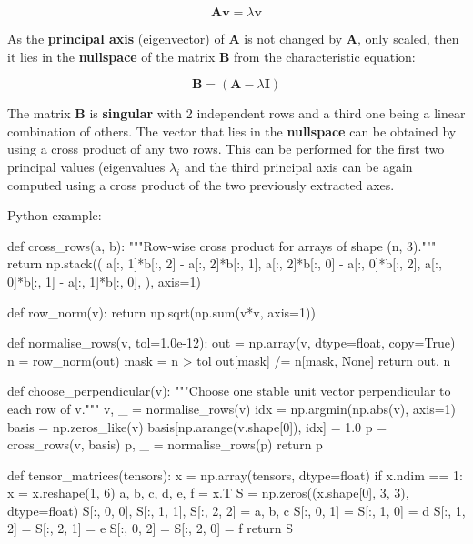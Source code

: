 \begin{itemize}
        \begin{equation}
            \mathbf{A}\mathbf{v} = \lambda \mathbf{v}
        \end{equation}

        As the \textbf{principal axis} (eigenvector) of $ \mathbf{A} $ is not changed
        by $ \mathbf{A} $, only scaled, then it lies in the \textbf{nullspace} of the
        matrix $ \mathbf{B} $ from the characteristic equation:

        \begin{equation}
            \mathbf{B} = (\mathbf{A} - \lambda \mathbf{I})
        \end{equation}

        The matrix $ \mathbf{B} $ is \textbf{singular} with 2 independent rows and
        a third one being a linear combination of others. The vector that lies
        in the \textbf{nullspace} can be obtained by using a cross product of any
        two rows. This can be performed for the first two principal values
        (eigenvalues $ \lambda_i $ and the third principal axis can be again
        computed using a cross product of the two previously extracted axes.

        Python example:

        \begin{python}
def cross_rows(a, b):
    """Row-wise cross product for arrays of shape (n, 3)."""
    return np.stack((
        a[:, 1]*b[:, 2] - a[:, 2]*b[:, 1],
        a[:, 2]*b[:, 0] - a[:, 0]*b[:, 2],
        a[:, 0]*b[:, 1] - a[:, 1]*b[:, 0],
    ), axis=1)


def row_norm(v):
    return np.sqrt(np.sum(v*v, axis=1))


def normalise_rows(v, tol=1.0e-12):
    out = np.array(v, dtype=float, copy=True)
    n = row_norm(out)
    mask = n > tol
    out[mask] /= n[mask, None]
    return out, n


def choose_perpendicular(v):
    """Choose one stable unit vector perpendicular to each row of v."""
    v, _ = normalise_rows(v)
    idx = np.argmin(np.abs(v), axis=1)
    basis = np.zeros_like(v)
    basis[np.arange(v.shape[0]), idx] = 1.0
    p = cross_rows(v, basis)
    p, _ = normalise_rows(p)
    return p


def tensor_matrices(tensors):
    x = np.array(tensors, dtype=float)
    if x.ndim == 1:
        x = x.reshape(1, 6)
    a, b, c, d, e, f = x.T
    S = np.zeros((x.shape[0], 3, 3), dtype=float)
    S[:, 0, 0], S[:, 1, 1], S[:, 2, 2] = a, b, c
    S[:, 0, 1] = S[:, 1, 0] = d
    S[:, 1, 2] = S[:, 2, 1] = e
    S[:, 0, 2] = S[:, 2, 0] = f
    return S



\end{python}
\end{itemize}
